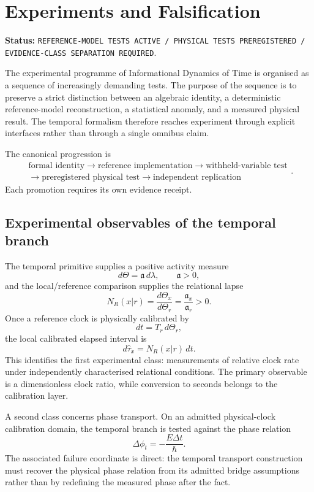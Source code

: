 \chapter{Experiments and Falsification}

\noindent\textbf{Status:} \texttt{REFERENCE-MODEL TESTS ACTIVE / PHYSICAL TESTS PREREGISTERED / EVIDENCE-CLASS SEPARATION REQUIRED}.

The experimental programme of Informational Dynamics of Time is organised as a sequence of increasingly demanding tests. The purpose of the sequence is to preserve a strict distinction between an algebraic identity, a deterministic reference-model reconstruction, a statistical anomaly, and a measured physical result. The temporal formalism therefore reaches experiment through explicit interfaces rather than through a single omnibus claim.

The canonical progression is
\[
\boxed{
\begin{gathered}
\text{formal identity}
\longrightarrow
\text{reference implementation}
\longrightarrow
\text{withheld-variable test}
\\
{}\longrightarrow
\text{preregistered physical test}
\longrightarrow
\text{independent replication}
\end{gathered}
}.
\]
Each promotion requires its own evidence receipt.

\section{Experimental observables of the temporal branch}

The temporal primitive supplies a positive activity measure
\[
d\Theta=\mathfrak a\,d\lambda,
\qquad \mathfrak a>0,
\]
and the local/reference comparison supplies the relational lapse
\[
N_R(x|r)=\frac{d\Theta_x}{d\Theta_r}
=\frac{\mathfrak a_x}{\mathfrak a_r}>0.
\]
Once a reference clock is physically calibrated by
\[
dt=T_r\,d\Theta_r,
\]
the local calibrated elapsed interval is
\[
d\widehat\tau_x=N_R(x|r)\,dt.
\]
This identifies the first experimental class: measurements of relative clock rate under independently characterised relational conditions. The primary observable is a dimensionless clock ratio, while conversion to seconds belongs to the calibration layer.

A second class concerns phase transport. On an admitted physical-clock calibration domain, the temporal branch is tested against the phase relation
\[
\Delta\phi_t=-\frac{E\Delta t}{\hbar}.
\]
The associated failure coordinate is direct: the temporal transport construction must recover the physical phase relation from its admitted bridge assumptions rather than by redefining the measured phase after the fact.

